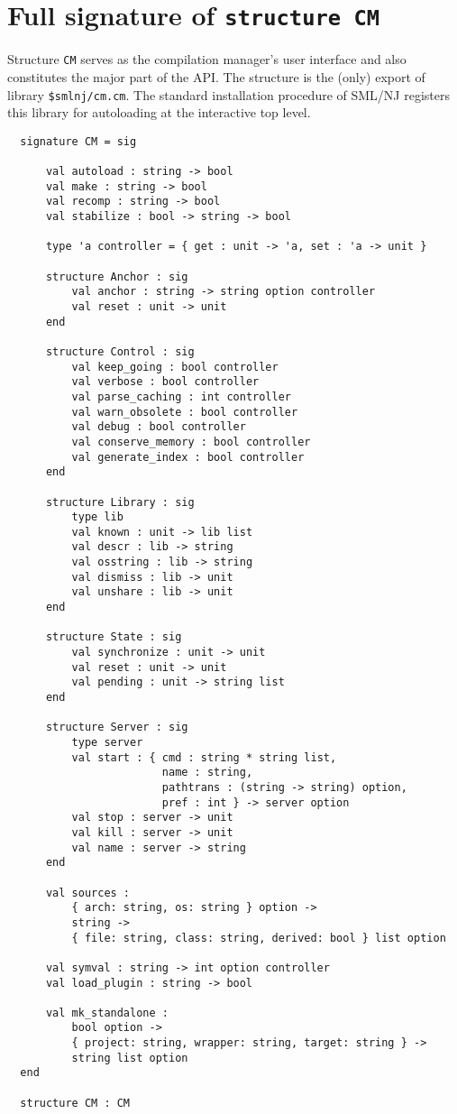
\section{Full signature of {\tt structure CM}}

Structure {\tt CM} serves as the compilation manager's user interface
and also constitutes the major part of the API.  The structure is the
(only) export of library {\tt \$smlnj/cm.cm}.  The standard
installation procedure of SML/NJ registers this library for
autoloading at the interactive top level.

\begin{small}
\begin{verbatim}
  signature CM = sig

      val autoload : string -> bool
      val make : string -> bool
      val recomp : string -> bool
      val stabilize : bool -> string -> bool

      type 'a controller = { get : unit -> 'a, set : 'a -> unit }

      structure Anchor : sig
          val anchor : string -> string option controller
          val reset : unit -> unit
      end

      structure Control : sig
          val keep_going : bool controller
          val verbose : bool controller
          val parse_caching : int controller
          val warn_obsolete : bool controller
          val debug : bool controller
          val conserve_memory : bool controller
          val generate_index : bool controller
      end

      structure Library : sig
          type lib
          val known : unit -> lib list
          val descr : lib -> string
          val osstring : lib -> string
          val dismiss : lib -> unit
          val unshare : lib -> unit
      end

      structure State : sig
          val synchronize : unit -> unit
          val reset : unit -> unit
          val pending : unit -> string list
      end

      structure Server : sig
          type server
          val start : { cmd : string * string list,
                        name : string,
                        pathtrans : (string -> string) option,
                        pref : int } -> server option
          val stop : server -> unit
          val kill : server -> unit
          val name : server -> string
      end

      val sources :
          { arch: string, os: string } option ->
          string ->
          { file: string, class: string, derived: bool } list option

      val symval : string -> int option controller
      val load_plugin : string -> bool

      val mk_standalone :
          bool option ->
          { project: string, wrapper: string, target: string } ->
          string list option
  end

  structure CM : CM
\end{verbatim}
\end{small}
